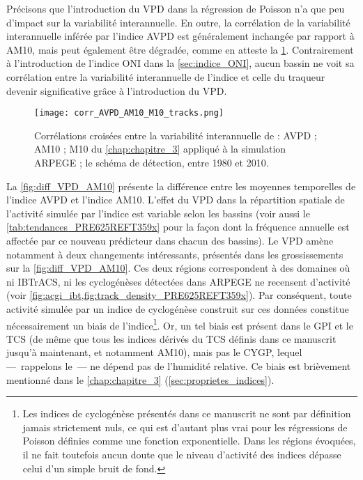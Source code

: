 \documentclass[../main.tex]{subfiles}
\begin{document}
Précisons que l'introduction du VPD dans la régression de Poisson n'a que peu d'impact sur la variabilité interannuelle. En outre, la corrélation de la
variabilité interannuelle inférée par l'indice AVPD est généralement inchangée par rapport à AM10, mais peut également être dégradée, comme en atteste la
\cref{fig:corr_AVPD_AM10_M10}. Contrairement à l'introduction de l'indice ONI dans la \cref{sec:indice_ONI}, aucun bassin ne voit sa corrélation entre la
variabilité interannuelle de l'indice et celle du traqueur devenir significative grâce à l'introduction du VPD.

\begin{figure}[htb]
    \centering
    \texttt{[image: corr\_AVPD\_AM10\_M10\_tracks.png]}
    \caption{Corrélations croisées entre la variabilité interannuelle de : AVPD ; AM10 ; M10 du \cref{chap:chapitre_3} appliqué à la simulation ARPEGE ; le
    schéma de détection, entre 1980 et 2010.}
    \label{fig:corr_AVPD_AM10_M10}
\end{figure}

La \cref{fig:diff_VPD_AM10} présente la différence entre les moyennes temporelles de l'indice AVPD et l'indice AM10. L'effet du VPD dans la répartition spatiale
de l'activité simulée par l'indice est variable selon les bassins (voir aussi le \cref{tab:tendances_PRE625REFT359x} pour la façon dont la fréquence annuelle
est affectée par ce nouveau prédicteur dans chacun des bassins). Le VPD amène notamment à deux changements intéressants, présentés dans les grossissements sur
la \cref{fig:diff_VPD_AM10}. Ces deux régions correspondent à des domaines où ni IBTrACS, ni les cyclogénèses détectées dans ARPEGE ne recensent d'activité
(voir \cref{fig:acgi_ibt,fig:track_density_PRE625REFT359x}). Par conséquent, toute activité simulée par un indice de cyclogénèse construit sur ces données
constitue nécessairement un biais de l'indice\footnote{Les indices de cyclogénèse présentés dans ce manuscrit ne sont par définition jamais strictement nuls, ce
qui est d'autant plus vrai pour les régressions de Poisson définies comme une fonction exponentielle. Dans les régions évoquées, il ne fait toutefois aucun
doute que le niveau d'activité des indices dépasse celui d'un simple bruit de fond.}. Or, un tel biais est présent dans le GPI et le TCS (de même que tous les
indices dérivés du TCS définis dans ce manuscrit jusqu'à maintenant, et notamment AM10), mais pas le CYGP, lequel ---~rappelons le~--- ne dépend pas de
l'humidité relative. Ce biais est brièvement mentionné dans le \cref{chap:chapitre_3} (\cref{sec:proprietes_indices}).
\end{document}
